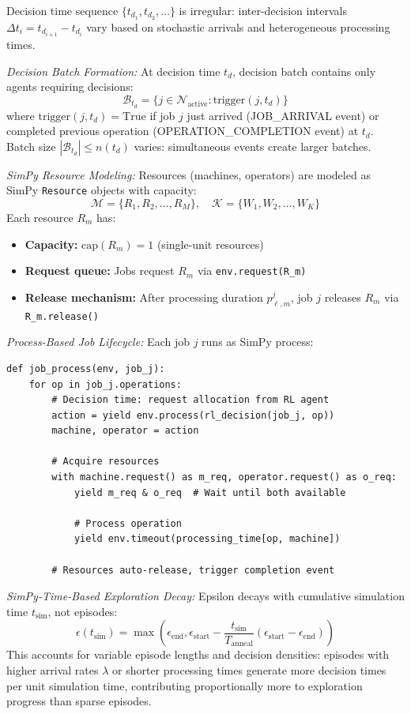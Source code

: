 Decision time sequence \( \{t_{d_1}, t_{d_2}, \ldots\} \) is irregular: inter-decision intervals \( \Delta t_i = t_{d_{i+1}} - t_{d_i} \) vary based on stochastic arrivals and heterogeneous processing times.

\textit{Decision Batch Formation:} At decision time \( t_d \), decision batch contains only agents requiring decisions:
\[
\mathcal{B}_{t_d} = \{j \in \mathcal{N}_{\text{active}} : \text{trigger}(j, t_d)\}
\]
where \( \text{trigger}(j, t_d) = \text{True} \) if job \( j \) just arrived (JOB\_ARRIVAL event) or completed previous operation (OPERATION\_COMPLETION event) at \( t_d \). Batch size \( |\mathcal{B}_{t_d}| \leq n(t_d) \) varies: simultaneous events create larger batches.

\textit{SimPy Resource Modeling:} Resources (machines, operators) are modeled as SimPy \texttt{Resource} objects with capacity:
\[
\mathcal{M} = \{R_1, R_2, \ldots, R_M\}, \quad \mathcal{K} = \{W_1, W_2, \ldots, W_K\}
\]
Each resource \( R_m \) has:
\begin{itemize}
\item \textbf{Capacity:} \( \text{cap}(R_m) = 1 \) (single-unit resources)
\item \textbf{Request queue:} Jobs request \( R_m \) via \texttt{env.request(R\_m)}
\item \textbf{Release mechanism:} After processing duration \( p_{\ell,m}^j \), job \( j \) releases \( R_m \) via \texttt{R\_m.release()}
\end{itemize}

\textit{Process-Based Job Lifecycle:} Each job \( j \) runs as SimPy process:
\begin{verbatim}
def job_process(env, job_j):
    for op in job_j.operations:
        # Decision time: request allocation from RL agent
        action = yield env.process(rl_decision(job_j, op))
        machine, operator = action
        
        # Acquire resources
        with machine.request() as m_req, operator.request() as o_req:
            yield m_req & o_req  # Wait until both available
            
            # Process operation
            yield env.timeout(processing_time[op, machine])
        
        # Resources auto-release, trigger completion event
\end{verbatim}

\textit{SimPy-Time-Based Exploration Decay:} Epsilon decays with cumulative simulation time \( t_{\text{sim}} \), not episodes:
\[
\epsilon(t_{\text{sim}}) = \max\left( \epsilon_{\text{end}}, \epsilon_{\text{start}} - \frac{t_{\text{sim}}}{T_{\text{anneal}}} (\epsilon_{\text{start}} - \epsilon_{\text{end}}) \right)
\]
This accounts for variable episode lengths and decision densities: episodes with higher arrival rates \( \lambda \) or shorter processing times generate more decision times per unit simulation time, contributing proportionally more to exploration progress than sparse episodes.


